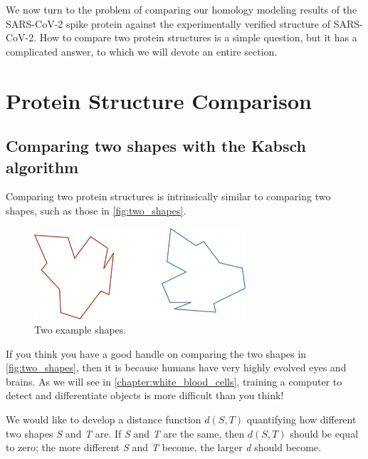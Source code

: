 We now turn to the problem of comparing our homology modeling results of the SARS-CoV-2 spike protein against the experimentally verified structure of SARS-CoV-2. How to compare two protein structures is a simple question, but it has a complicated answer, to which we will devote an entire section.\\

\FloatBarrier
{}

\section{Protein Structure Comparison}
\label{sec:accuracy}

\subsection{Comparing two shapes with the Kabsch algorithm}

Comparing two protein structures is intrinsically similar to comparing two shapes, such as those in \autoref{fig:two_shapes}.\\

\begin{qbox}\end{qbox}

\begin{figure}[h]
	\centering
	\mySfFamily
	\includegraphics[width = 0.7\textwidth]{../images/two_shapes.png}
	\caption{Two example shapes.}
	\label{fig:two_shapes}
\end{figure}

If you think you have a good handle on comparing the two shapes in \autoref{fig:two_shapes}, then it is because humans have very highly evolved eyes and brains. As we will see in \autoref{chapter:white_blood_cells}, training a computer to detect and differentiate objects is more difficult than you think!

We would like to develop a distance function $d(S, T)$ quantifying how different two shapes \textit{S} and \textit{T} are. If \textit{S} and \textit{T} are the same, then $d(S, T)$ should be equal to zero; the more different \textit{S} and \textit{T} become, the larger \textit{d} should become.

